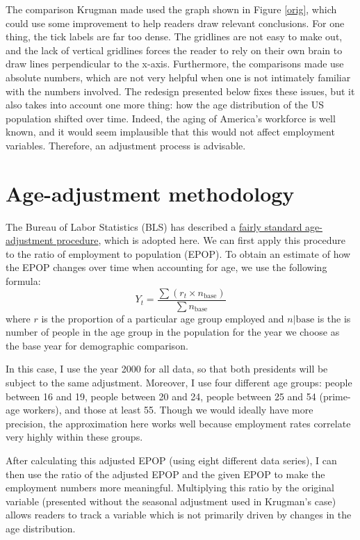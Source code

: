 \documentclass[12pt]{amsart}
\begin{document}
The comparison Krugman made used the graph shown in Figure \ref{orig}, which could use some improvement to help readers draw relevant conclusions. For one thing, the tick labels are far too dense. The gridlines are not easy to make out, and the lack of vertical gridlines forces the reader to rely on their own brain to draw lines perpendicular to the x-axis. Furthermore, the comparisons made use absolute numbers, which are not very helpful when one is not intimately familiar with the numbers involved. The redesign presented below fixes these issues, but it also takes into account one more thing: how the age distribution of the US population shifted over time. Indeed, the aging of America's workforce is well known, and it would seem implausible that this would not affect employment variables. Therefore, an adjustment process is advisable.


\section*{Age-adjustment methodology}
The Bureau of Labor Statistics (BLS) has described a \href{http://www.bls.gov/opub/mlr/2002/09/art3full.pdf}{fairly standard age-adjustment procedure}, which is adopted here. We can first apply this procedure to the ratio of employment to population (EPOP).
To obtain an estimate of how the EPOP changes over time when accounting for age, we use the following formula:
\begin{equation*}
Y_t = \frac{\sum (r_t \times n_{\text{base}})}{\sum n_{\text{base}}}
\end{equation*}
where $r$ is the proportion of a particular age group employed and $n|{\text{base}}$ is the is number of people in the age group in the population for the year we choose as the base year for demographic comparison. 

In this case, I use the year 2000 for all data, so that both presidents will be subject to the same adjustment. Moreover, I use four different age groups: people between 16 and 19, people between 20 and 24, people between 25 and 54 (prime-age workers), and those at least 55. Though we would ideally have more precision, the approximation here works well because employment rates correlate very highly within these groups. 

After calculating this adjusted EPOP (using eight different data series), I can then use the ratio of the adjusted EPOP and the given EPOP to make the employment numbers more meaningful. Multiplying this ratio by the original variable (presented without the seasonal adjustment used in Krugman's case) allows readers to track a variable which is not primarily driven by changes in the age distribution.
\end{document}

